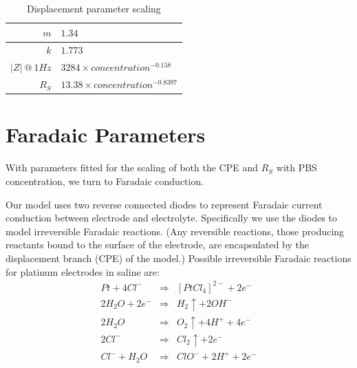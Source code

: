 \documentclass[journal, a4paper]{IEEEtran}
\begin{document}
\begin{table}
    \begin{center}
        \begin{tabular}{|r|l|}
            \hline
            $m$ & $1.34$ \\ \hline
            $k$ & $1.773$\\ \hline
            $|Z|\: @\: 1Hz$& $3284 \times concentration^{-0.158}$ \\ \hline
            $R_{S}$ & $13.38 \times concentration^{-0.8397} $\\ \hline
        \end{tabular}
    \end{center}
    \caption{Displacement parameter scaling}
    \label{tab:CPEparams}
\end{table}



\section{Faradaic Parameters}

With parameters fitted for the scaling of both the CPE and $R_{S}$ with PBS concentration, we turn to Faradaic conduction.

Our model uses two reverse connected diodes to represent Faradaic current conduction between electrode and electrolyte. Specifically we use the diodes to model irreversible Faradaic reactions. (Any reversible reactions, those producing reactants bound to the surface of the electrode, are encapsulated by the displacement branch (CPE) of the model.)
Possible irreversible Faradaic reactions for platinum electrodes in saline are:
\begin{eqnarray}
    Pt + 4Cl^{-} &\Rightarrow& [PtCl_{4}]^{2-} + 2 e^{-}\\
    2H_{2}O + 2 e^{-} &\Rightarrow& H_{2}\uparrow + 2OH^{-}\\
    2H_{2}O &\Rightarrow& O_{2}\uparrow + 4H^{+} + 4e^{-}\\
    2Cl^{-} &\Rightarrow& Cl_{2}\uparrow + 2e^{-}\\
    Cl^{-} + H_{2}O &\Rightarrow& ClO^{-} + 2H^{+} + 2e^{-}
\end{eqnarray}
\end{document}
